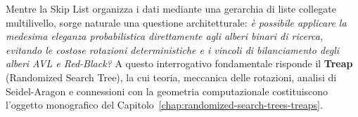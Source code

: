 Mentre la Skip List organizza i dati mediante una gerarchia di liste collegate multilivello, sorge naturale una questione architetturale: \textit{\`e possibile applicare la medesima eleganza probabilistica direttamente agli alberi binari di ricerca, evitando le costose rotazioni deterministiche e i vincoli di bilanciamento degli alberi AVL e Red-Black?}
A questo interrogativo fondamentale risponde il \textbf{Treap} (Randomized Search Tree), la cui teoria, meccanica delle rotazioni, analisi di Seidel-Aragon e connessioni con la geometria computazionale costituiscono l'oggetto monografico del Capitolo~\ref{chap:randomized-search-trees-treaps}.
